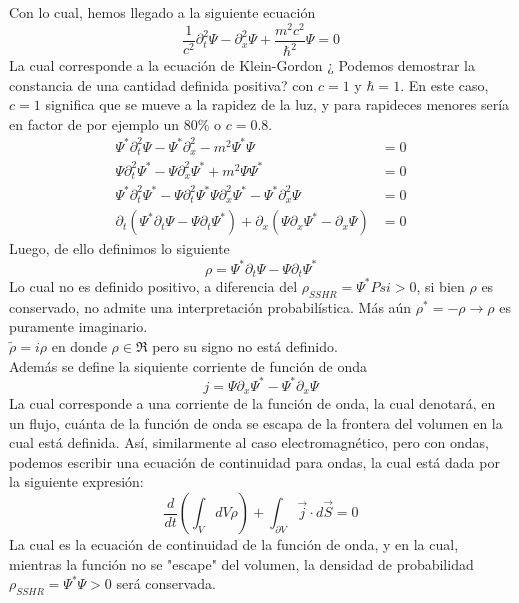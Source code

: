\documentclass[../main.tex]{subfiles}
\begin{document}
Con lo cual, hemos llegado a la siguiente ecuación
\begin{equation}
  \boxed{\frac{1}{c^2}\partial^2_t\Psi - \partial^2_x\Psi + \frac{m^2c^2}{\hbar^2}\Psi = 0}
\end{equation}
La cual corresponde a la ecuación de Klein-Gordon ¿ Podemos demostrar la constancia de una cantidad definida positiva? con $c= 1$ y $\hbar=1$. En este caso, $c=1$ significa que se mueve a la rapidez de la luz, y para rapideces menores sería en factor de por ejemplo un 80$\%$ o $c=0.8$.  \\ 
\begin{align*}
  \Psi^*  \partial^2_t \Psi - \Psi^* \partial^2_x - m^2 \Psi^* \Psi  & = 0 \\
  \Psi \partial^2_t \Psi^* - \Psi \partial^2_x \Psi^* + m^2 \Psi \Psi^*  & = 0 \\ 
  \Psi^*\partial^2_t \Psi^* - \Psi \partial^2_t \Psi^* \Psi \partial^2_x \Psi^*- \Psi^*\partial^2_x \Psi & = 0 \\
  \partial_t \left( \Psi^*\partial_t\Psi - \Psi\partial_t\Psi^* \right) + \partial_x\left( \Psi\partial_x \Psi^* - \partial_x\Psi \right) & = 0
\end{align*}
Luego, de ello definimos lo siguiente
\begin{equation}
  \rho = \Psi^*\partial_t\Psi - \Psi\partial_t\Psi^*
\end{equation}
Lo cual no es definido positivo, a diferencia del $\rho_{SSHR}= \Psi^*Psi>0$, si bien $\rho$ es conservado, no admite una interpretación probabilística. Más aún $\rho^*=-\rho \rightarrow \rho$ es puramente imaginario. \\
$\tilde{\rho}=i\rho$ en donde $\rho\in\mathfrak{R}$ pero su signo no está definido. \\
Además se define la siquiente corriente de función de onda
\begin{equation}
  j= \Psi\partial_x\Psi^* - \Psi^*\partial_x\Psi 
\end{equation}
La cual corresponde a una corriente de la función de onda, la cual denotará, en un flujo, cuánta de la función de onda se escapa de la frontera del volumen en la cual está definida. Así, similarmente al caso electromagnético, pero con ondas, podemos escribir una ecuación de continuidad para ondas, la cual está dada por la siguiente expresión:
\begin{equation}
  \frac{d}{dt}\left( \int_VdV\rho \right) + \int_{\partial V}\vec{j}\cdot d\vec{S} = 0
\end{equation}
La cual es la ecuación de continuidad de la función de onda,  y en la cual, mientras la función no se "escape" del volumen, la densidad de probabilidad $\rho_{SSHR}=\Psi^*\Psi>0$ será conservada. \\ 
\end{document}
